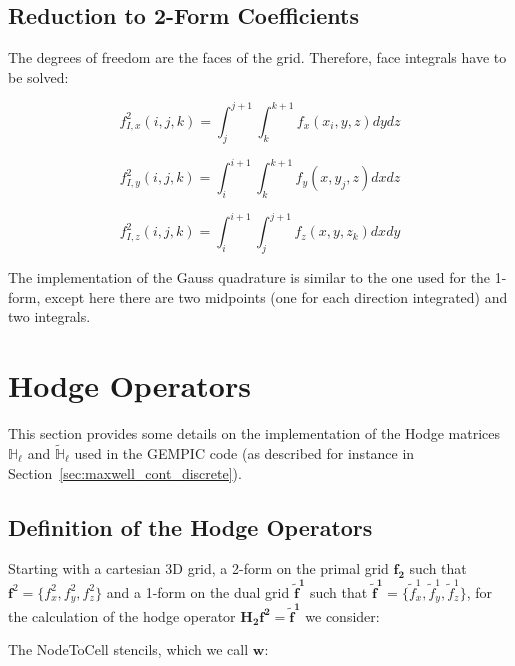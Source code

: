 \documentclass[11pt]{article}
\begin{document}
\subsection{Reduction to 2-Form Coefficients}
The degrees of freedom are the faces of the grid. Therefore, face integrals have to be solved:

\begin{equation}
    f_{I,x}^2(i, j, k) = \int _{j} ^ {j+1} \int _{k} ^ {k+1} f_x (x_i, y, z) dy dz
\end{equation}

\begin{equation}
    f_{I,y}^2(i, j, k) = \int _{i} ^ {i+1} \int _{k} ^ {k+1} f_y (x, y_j, z) dx dz
\end{equation}

\begin{equation}
    f_{I,z}^2(i, j, k) = \int _{i} ^ {i+1} \int _{j} ^ {j+1} f_z (x, y, z_k) dx dy
\end{equation}

The implementation of the Gauss quadrature is similar to the one used for the 1-form, except here there are two midpoints (one for each direction integrated) and two integrals.



\section{Hodge Operators}


This section provides some details on the implementation of the Hodge matrices
$\mathbb{H}_{\ell}$ and $\tilde{\mathbb{H}}_{\ell}$ used in the GEMPIC code
(as described for instance in Section~\ref{sec:maxwell_cont_discrete}).     


\subsection{Definition of the Hodge Operators}
Starting with a cartesian 3D grid, a 2-form on the primal grid $\mathbf{f_2}$ such that 
$ \mathbf{f}^2 = \{ f_{x}^2, f_{y}^2, f_{z}^2 \}$ and a 1-form on the dual grid $\mathbf{\tilde f^1}$ 
such that $ \mathbf{\tilde f^1} = \{ \tilde f_{x}^1, \tilde f_{y}^1, \tilde f_{z}^1 \}$, for the calculation 
of the hodge operator $\mathbf{H_2}\mathbf{f^2} = \mathbf{\tilde f^1}$ we consider:
\linebreak

The NodeToCell stencils, which we call $\mathbf{w}$: 
\end{document}
